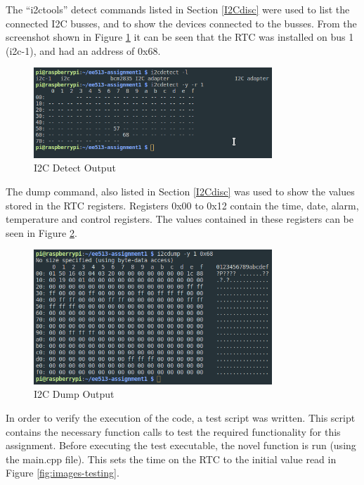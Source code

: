The ``i2ctools'' detect commands listed in Section \ref{I2Cdisc} were used to
list the connected I2C busses, and to show the devices connected to the busses.
From the screenshot shown in Figure \ref{fig:images-i2cDetect} it can be seen
that the RTC was installed on bus 1 (i2c-1), and had an address of 0x68.

\begin{figure}[H]
	\centering
	\includegraphics[width=0.8\textwidth]{images/i2cDetect}
	\caption{I2C Detect Output}
	\label{fig:images-i2cDetect}
\end{figure}

The dump command, also listed in Section \ref{I2Cdisc} was used to show the
values stored in the RTC registers. Registers 0x00 to 0x12 contain the time,
date, alarm, temperature and control registers. The values contained in these
registers can be seen in Figure \ref{fig:images-i2cDump}.

\begin{figure}[H]
	\centering
	\includegraphics[width=0.8\textwidth]{images/i2cDump}
	\caption{I2C Dump Output}
	\label{fig:images-i2cDump}
\end{figure}

In order to verify the execution of the code, a test script was written.
This script contains the necessary function calls to test the required
functionality for this assignment. Before executing the test executable, the
novel function is run (using the main.cpp file). This sets the time on the RTC
to the initial value read in Figure \ref{fig:images-testing}.


